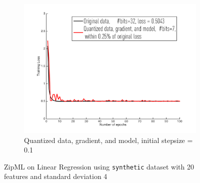 \documentclass{article}
\begin{document}
\begin{figure}[h]
\begin{subfigure}[h]{.3\columnwidth}
    \includegraphics[width=\columnwidth]{lr/synthetic/20hard/dgm01}
     \caption{Quantized data, gradient, and model, initial stepsize = 0.1}
    \end{subfigure}
    
\caption{ZipML on Linear Regression using \texttt{synthetic} dataset with 20 features and standard deviation 4}
\label{fig:lr20hard}
\end{figure}
\end{document}
